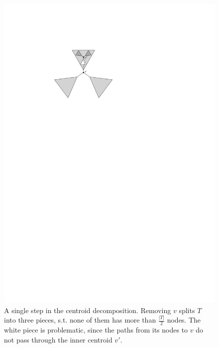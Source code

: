 \documentclass[a4paper,UKenglish]{lipics-v2016}
\theoremstyle{plain}
\begin{document}
\begin{figure}[ht]
\begin{center}
\includegraphics[scale=1]{centroid}
\end{center}
\caption{A single step in the centroid decomposition. Removing $v$ splits $T$ into three pieces, s.t. none of them has more than $\frac{|T|}{2}$ nodes. The white piece is problematic, since the paths from its nodes to $v$ do not pass through the inner centroid $v'$.}
\end{figure}
\end{document}
